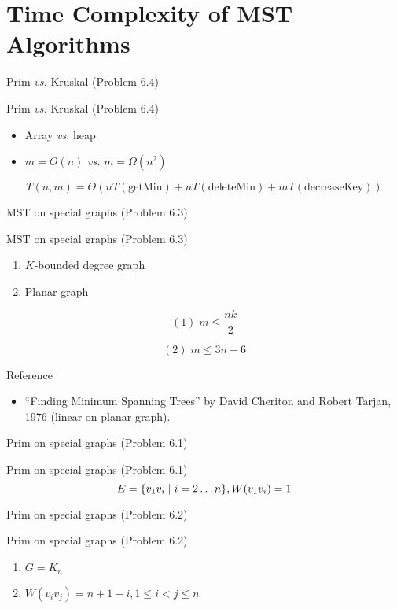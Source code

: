 \section{Time Complexity of MST Algorithms}

\begin{frame}{Prim \emph{vs.} Kruskal (Problem 6.4)}
  \begin{exampleblock}{Prim \emph{vs.} Kruskal (Problem 6.4)}
	\begin{itemize}
	  \item Array \emph{vs.} heap
	  \item $m = O(n)$ \emph{vs.} $m = \Omega(n^2)$
	\end{itemize}

	\[
	  T(n,m) = O(n T(\text{getMin}) + n T(\text{deleteMin}) + m T(\text{decreaseKey}))
	\]
  \end{exampleblock}
\end{frame}
\begin{frame}{MST on special graphs (Problem 6.3)}
  \begin{exampleblock}{MST on special graphs (Problem 6.3)}
	\begin{enumerate}
	  \item $K$-bounded degree graph
	  \item Planar graph
	\end{enumerate}
  \end{exampleblock}

  \[
	(1)\; m \le \frac{nk}{2}
  \]

  \[
	(2)\; m \le 3n - 6
  \]

  \begin{alertblock}{Reference}
	\begin{itemize}
	  \item ``Finding Minimum Spanning Trees'' by David Cheriton and Robert Tarjan, 1976 (linear on planar graph).
	\end{itemize}
  \end{alertblock}
\end{frame}
\begin{frame}{Prim on special graphs (Problem 6.1)}
  \begin{exampleblock}{Prim on special graphs (Problem 6.1)}
	\[
	  E = \{v_1v_i \mid i = 2 \dots n\}, W(v_1v_i) = 1
	\]
  \end{exampleblock}
\end{frame}
\begin{frame}{Prim on special graphs (Problem 6.2)}
  \begin{exampleblock}{Prim on special graphs (Problem 6.2)}
	\begin{enumerate}
	  \item $G = K_n$
	  \item $W(v_iv_j) = n + 1 -i, 1 \le i < j \le n$
	\end{enumerate}
  \end{exampleblock}
\end{frame}
